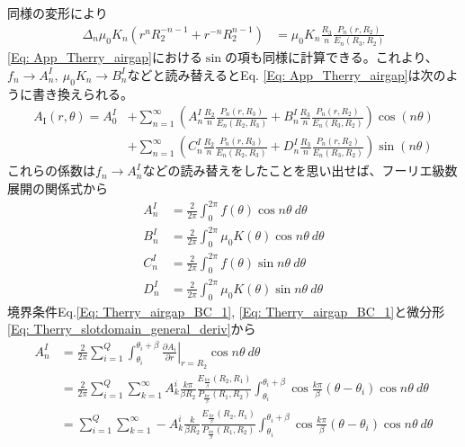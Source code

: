 \documentclass[a4paper, 11pt]{article}
\begin{document}
同様の変形により
\begin{align}
    \Delta_n \mu_0K_n (r^n R_2^{-n-1} + r^{-n}R_2^{n-1}) &= \mu_0K_n\frac{R_3}{n} \frac{P_n(r,R_2)}{E_n(R_3,R_2)}
\end{align}
\color{Black}
\eqref{Eq: App_Therry_airgap}における$\sin$の項も同様に計算できる。これより、$f_n\rightarrow A_n^I,~ \mu_0K_n \rightarrow B_n^I$などと読み替えるとEq. \eqref{Eq: App_Therry_airgap}は次のように書き換えられる。
\begin{align}
    A_{\mathrm{I}}(r,\theta) = A_0^I & + \sum_{n=1}^\infty \left(A_n^I\frac{R_2}{n}\displaystyle \frac{P_n(r,R_3)}{E_n(R_2,R_3)} + B_n^I\frac{R_3}{n} \frac{P_n(r,R_2)}{E_n(R_3,R_2)} \right)\cos(n\theta) \nonumber \\ & + \sum_{n=1}^\infty \left(C_n^I\frac{R_2}{n}\displaystyle \frac{P_n(r,R_3)}{E_n(R_2,R_3)} + D_n^I\frac{R_3}{n} \frac{P_n(r,R_2)}{E_n(R_3,R_2)} \right)\sin(n\theta)\label{Eq: Therry_airgap_general}
\end{align}
これらの係数は$f_n\rightarrow A_n^I$などの読み替えをしたことを思い出せば、フーリエ級数展開の関係式から
\begin{align}
    A_n^I & = \frac{2}{2\pi} \int_0^{2\pi} f(\theta) \cos n\theta~d\theta \\
    B_n^I & = \frac{2}{2\pi} \int_0^{2\pi} \mu_0 K(\theta) \cos n\theta~d\theta \\
    C_n^I &= \frac{2}{2\pi} \int_0^{2\pi} f(\theta) \sin n\theta~d\theta \\
    D_n^I &= \frac{2}{2\pi} \int_0^{2\pi} \mu_0 K(\theta) \sin n\theta~d\theta
\end{align}
\color{ForestGreen}
境界条件Eq.\eqref{Eq: Therry_airgap_BC_1}, \eqref{Eq: Therry_airgap_BC_1}と微分形\eqref{Eq: Therry_slotdomain_general_deriv}から
\begin{align}
    A_n^I & = \frac{2}{2\pi}\sum_{i=1}^Q \int_{\theta_i}^{\theta_i+\beta} \left. \frac{\partial A_i}{\partial r} \right|_{r=R_2} \cos n\theta~d\theta\\
    & = \frac{2}{2\pi}\sum_{i=1}^Q \sum_{k=1}^\infty A_k^i \frac{k\pi}{\beta R_2}\frac{E_{\frac{k\pi}{\beta}}(R_2,R_1)}{P_{\frac{k\pi}{\beta}}(R_1,R_2)}\int_{\theta_i}^{\theta_i+\beta} \cos \frac{k\pi}{\beta}(\theta-\theta_i)\cos n\theta~d\theta\\
    & = \sum_{i=1}^Q \sum_{k=1}^\infty -A_k^i \frac{k}{\beta R_2}\frac{E_{\frac{k\pi}{\beta}}(R_2,R_1)}{P_{\frac{k\pi}{\beta}}(R_1,R_2)}\int_{\theta_i}^{\theta_i+\beta} \cos \frac{k\pi}{\beta}(\theta-\theta_i)\cos n\theta~d\theta
\end{align}
\end{document}
